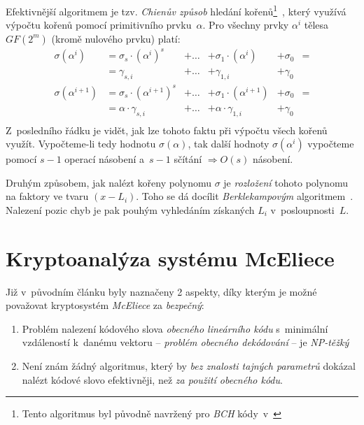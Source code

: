\documentclass[thesis=M,czech,hidelinks]{FITthesis}[2012/06/26]
\newcommand{\0}{{\textcolor[gray]{0.75}{0}}}
\begin{document}
Efektivnější algoritmem je tzv. \emph{Chienův způsob} hledání kořenů\footnote{
    Tento algoritmus byl původně navržený pro \emph{BCH} kódy~v~\cite{Chien}
}~\cite{FIT_AAK,Heyse}, který využívá výpočtu kořenů pomocí primitivního
prvku~$\alpha$. Pro všechny prvky $\alpha^i$ tělesa $GF(2^m)$ (kromě nulového
prvku) platí:
\begin{align*}
    \sigma\left(\alpha^i\right)     &= \sigma_s \cdot \left(\alpha^i\right)^s     &+ \ldots &+ \sigma_1 \cdot \left(\alpha^i\right)     &+ \sigma_0 &= \\
                                    &= \gamma_{s,i}                               &+ \ldots &+ \gamma_{1,i}                             &+ \gamma_0 &  \\
    \sigma\left(\alpha^{i+1}\right) &= \sigma_s \cdot \left(\alpha^{i+1}\right)^s &+ \ldots &+ \sigma_1 \cdot \left(\alpha^{i+1}\right) &+ \sigma_0 &= \\
                                    &= \alpha \cdot \gamma_{s,i}                  &+ \ldots &+ \alpha \cdot \gamma_{1,i}                &+ \gamma_0 &  \\
\end{align*}
Z~posledního řádku je vidět, jak lze tohoto faktu při výpočtu všech kořenů
využít. Vypočteme-li tedy hodnotu $\sigma(\alpha)$, tak další hodnoty
$\sigma\left(\alpha^i\right)$ vypočteme pomocí $s-1$ operací násobení a~$s-1$
sčítání $\Rightarrow O(s)$ násobení.

Druhým způsobem, jak nalézt kořeny polynomu $\sigma$ je \emph{rozložení} tohoto
polynomu na faktory ve tvaru $(x-L_i)$. Toho se dá docílit \emph{Berklekampovým}
algoritmem~\cite{Berlekamp3}. Nalezení pozic chyb je pak pouhým vyhledáním
získaných $L_i$ v~posloupnosti~$L$.





\chapter{Kryptoanalýza systému McEliece}\label{kap_kryptoanalyza}

Již v~původním článku \cite{McEliece} byly naznačeny 2 aspekty, díky kterým je
možné považovat kryptosystém \emph{McEliece} za \emph{bezpečný}:

\begin{enumerate}
    \item Problém nalezení kódového slova \emph{obecného lineárního kódu}
        s~minimální vzdáleností k~danému vektoru -- \emph{problém obecného
        dekódování} -- je \emph{NP-těžký}~\cite{Berlekamp1}

    \item Není znám žádný algoritmus, který by \emph{bez znalosti tajných parametrů}
        dokázal nalézt kódové slovo efektivněji, než \emph{za použití obecného kódu}.
\end{enumerate}
\end{document}

